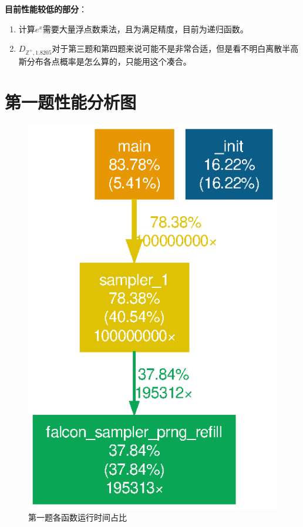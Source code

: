 \documentclass{article}
\begin{document}
    \textbf{目前性能较低的部分}：
    \begin{enumerate}
        \item 计算$e^x$需要大量浮点数乘法，且为满足精度，目前为递归函数。
        \item $D_{\mathbb{Z}^+, 1.8205}$对于第三题和第四题来说可能不是非常合适，但是看不明白离散半高斯分布各点概率是怎么算的，只能用这个凑合。
    \end{enumerate}

    

    \appendix
    \newpage
    \section{第一题性能分析图}
    \begin{figure}[h!]
        \centering
        \includegraphics[width=.6\textwidth]{../gprof_figs/sampler_1.eps}
        \caption{第一题各函数运行时间占比}
    \end{figure}

    \newpage
\end{document}
